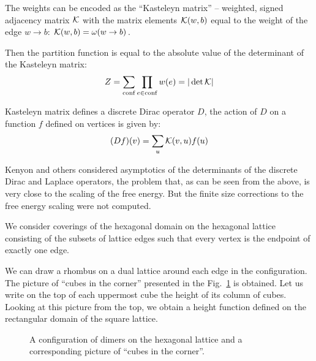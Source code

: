 \documentclass{article}
\begin{document}
The weights can be encoded as the ``Kasteleyn matrix'' -- weighted, signed adjacency matrix ${\cal K}$ with
the matrix elements ${\cal K}(w,b)$ equal to the weight of the edge $w\to b$: ${\cal K}(w,b)=\omega(w\to b)$.

Then the partition function is equal to the absolute value of the determinant of the Kasteleyn
matrix\cite{P.W-1961,doi:10.1080/14786436108243366}: 
\begin{equation}
  \label{eq:15}
  Z=\sum_{\mathrm{conf}}\prod_{e\in \mathrm{conf}}w(e)=|\det {\cal K}|
\end{equation}

Kasteleyn matrix defines a discrete Dirac operator $D$, the action of $D$ on a function $f$ defined
on vertices is given by:
\begin{equation}
  \label{eq:16}
  (Df)(v)=\sum_{u}{\cal K}(v,u) f(u)
\end{equation}

Kenyon \cite{kenyon2002laplacian,kenyon2000asymptotic} and others \cite{sridhar2015asymptotic}
considered asymptotics of the determinants of the discrete Dirac and Laplace operators, the problem
that, as can be seen from the above, is very close to the scaling of the free energy. But the finite
size corrections to the free energy scaling were not computed. 
  
We consider coverings of the hexagonal domain on the hexagonal lattice consisting of the subsets of
lattice edges such that every vertex is the endpoint of exactly one edge.

We can draw a rhombus on a dual lattice around each edge in the configuration. The picture of
``cubes in the corner'' presented in the Fig.~\ref{dhf} is obtained. Let us write on the top of each
uppermost cube the height of its column of cubes. Looking at this picture from the top, we obtain a
height function defined on the rectangular domain of the square lattice. 

\begin{figure}[htbp]
\caption{\label{dhf}A configuration of dimers on the hexagonal lattice and a corresponding picture
  of ``cubes in the corner''.}
\end{figure}
\end{document}
